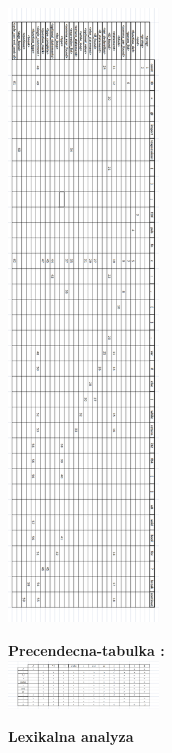 \documentclass[12pt]{article}
\begin{document}
\includegraphics[width=0.3\textwidth,scale=0.3]{LLtabulka}

 \Large \textbf{Precendecna-tabulka :}
\newline \\

\includegraphics[width=0.3\textwidth,scale=0.3]{Ptabulka}


\newpage

 \Large \textbf{Lexikalna analyza} \normalsize \\
\noindent\makebox[\linewidth]{\rule{\textwidth}{0.4pt}}
\end{document}
